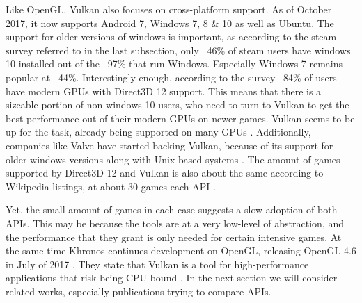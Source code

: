 Like OpenGL, Vulkan also focuses on cross-platform support.
As of October 2017, it now supports Android 7, Windows 7, 8 \& 10 as well as Ubuntu\cite{vulkanConformance}.
The support for older versions of windows is important, as according to the steam survey referred to in the last subsection, only ~46\% of steam users have windows 10 installed out of the ~97\% that run Windows\cite{steamStats}.
Especially Windows 7 remains popular at ~44\%. Interestingly enough, according to the survey ~84\% of users have modern \glspl{GPU} with Direct3D 12 support.
This means that there is a sizeable portion of non-windows 10 users, who need to turn to Vulkan to get the best performance out of their modern \glspl{GPU} on newer games.
Vulkan seems to be up for the task, already being supported on many \glspl{GPU} \cite{vulkanConformance}.
Additionally, companies like Valve have started backing Vulkan, because of its support for older windows versions along with Unix-based systems \cite{siggraph2015}.
The amount of games supported by Direct3D 12 and Vulkan is also about the same according to Wikipedia listings, at about 30 games each \gls{API} \cite{wikiVulkanGames} \cite{wikiDX12Games}.

Yet, the small amount of games in each case suggests a slow adoption of both \glspl{API}.
This may be because the tools are at a very low-level of abstraction, and the performance that they grant is only needed for certain intensive games.
At the same time Khronos continues development on OpenGL, releasing OpenGL 4.6 in July of 2017 \cite{wikiOpenGL}.
They state that Vulkan is a tool for high-performance applications that risk being CPU-bound \cite{vulkanPresentationFeb2016}. 
In the next section we will consider related works, especially publications trying to compare \glspl{API}. 

